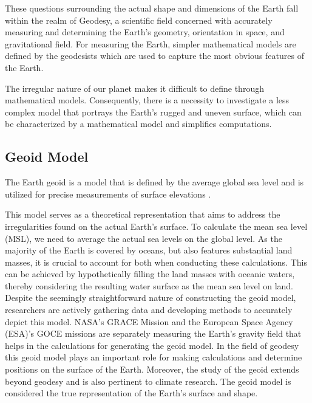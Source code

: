These questions surrounding the actual shape and dimensions of the Earth fall within the realm of Geodesy, a scientific field concerned with accurately measuring and determining the Earth's geometry, orientation in space, and gravitational field.
For measuring the Earth, simpler mathematical models are defined by the geodesists which are used to capture the most obvious features of the Earth\cite{GEODESY}.

The irregular nature of our planet makes it difficult to define through mathematical models.
Consequently, there is a necessity to investigate a less complex model that portrays the Earth's rugged and uneven surface, which can be characterized by a mathematical model and simplifies computations.

\subsection{Geoid Model}
The Earth geoid is a model that is defined by the average global sea level and is utilized for precise measurements of surface elevations \cite{NOAA_GEOID}.

This model serves as a theoretical representation that aims to address the irregularities found on the actual Earth's surface. To calculate the mean sea level (MSL), we need to average the actual sea levels on the global level.
As the majority of the Earth is covered by oceans, but also features substantial land masses, it is crucial to account for both when conducting these calculations.
This can be achieved by hypothetically filling the land masses with oceanic waters, thereby considering the resulting water surface as the mean sea level on land. Despite the seemingly straightforward nature of constructing the geoid model, researchers are actively gathering data and developing methods to accurately depict this model.
NASA's GRACE Mission and the European Space Agency (ESA)'s GOCE missions are separately measuring the Earth's gravity field that helps in the calculations for generating the geoid model.
In the field of geodesy this geoid model plays an important role for making calculations and determine positions on the surface of the Earth. Moreover, the study of the geoid extends beyond geodesy and is also pertinent to climate research\cite{GISGEO_GEOID}. The geoid model is considered the true representation of the Earth's surface and shape.

